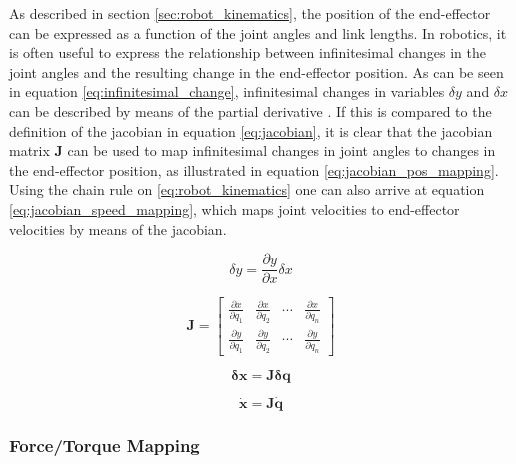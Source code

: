As described in section \ref{sec:robot_kinematics}, the position of the end-effector can be expressed as a function of the joint angles and link lengths. In robotics, it is often useful to express the relationship between infinitesimal changes in the joint angles and the resulting change in the end-effector position. As can be seen in equation \ref{eq:infinitesimal_change}, infinitesimal changes in variables $\delta y$ and $\delta x$ can be described by means of the partial derivative \cite{modsim}. If this is compared to the definition of the jacobian in equation \ref{eq:jacobian}, it is clear that the jacobian matrix $\mathbf{J}$ can be used to map infinitesimal changes in joint angles to changes in the end-effector position, as illustrated in equation \ref{eq:jacobian_pos_mapping}. Using the chain rule on \ref{eq:robot_kinematics} one can also arrive at equation \ref{eq:jacobian_speed_mapping}, which maps joint velocities to end-effector velocities by means of the jacobian.

\begin{equation}
    \label{eq:infinitesimal_change}
    \delta  y = \frac{\partial y}{\partial x} \delta x
\end{equation}

\begin{equation}
    \label{eq:jacobian}
    \mathbf{J} = \begin{bmatrix}
        \frac{\partial x}{\partial q_1} & \frac{\partial x}{\partial q_2} & \cdots & \frac{\partial x}{\partial q_n} \\
        \frac{\partial y}{\partial q_1} & \frac{\partial y}{\partial q_2} & \cdots & \frac{\partial y}{\partial q_n}
    \end{bmatrix}
\end{equation}

\begin{equation}
    \label{eq:jacobian_pos_mapping}
    \mathbf{\delta x} = \mathbf{J}\mathbf{\delta q}
\end{equation}

\begin{equation}
    \label{eq:jacobian_speed_mapping}
    \mathbf{\dot x} = \mathbf{J}\mathbf{\dot q}
\end{equation}

    \subsubsection{Force/Torque Mapping}
    \label{sec:force_torque_mapping}

